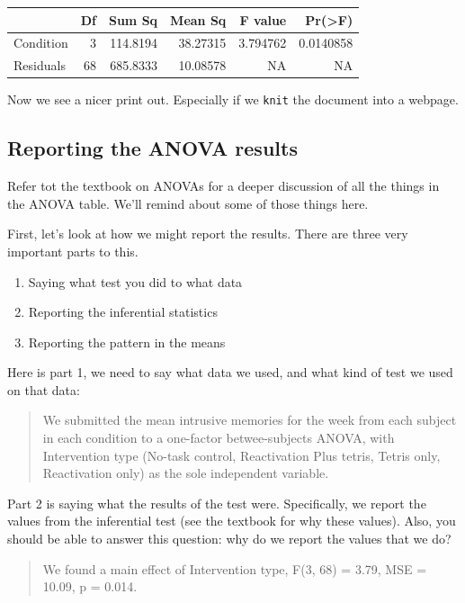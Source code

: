 \documentclass[]{book}
\providecommand{\tightlist}{%
  \setlength{\itemsep}{0pt}\setlength{\parskip}{0pt}}
\begin{document}
\begin{tabular}{l|r|r|r|r|r}
\hline
  & Df & Sum Sq & Mean Sq & F value & Pr(>F)\\
\hline
Condition & 3 & 114.8194 & 38.27315 & 3.794762 & 0.0140858\\
\hline
Residuals & 68 & 685.8333 & 10.08578 & NA & NA\\
\hline
\end{tabular}

Now we see a nicer print out. Especially if we \texttt{knit} the
document into a webpage.

\subsection{Reporting the ANOVA
results}\label{reporting-the-anova-results}

Refer tot the textbook on ANOVAs for a deeper discussion of all the
things in the ANOVA table. We'll remind about some of those things here.

First, let's look at how we might report the results. There are three
very important parts to this.

\begin{enumerate}
\def\labelenumi{\arabic{enumi}.}
\tightlist
\item
  Saying what test you did to what data
\item
  Reporting the inferential statistics
\item
  Reporting the pattern in the means
\end{enumerate}

Here is part 1, we need to say what data we used, and what kind of test
we used on that data:

\begin{quote}
We submitted the mean intrusive memories for the week from each subject
in each condition to a one-factor betwee-subjects ANOVA, with
Intervention type (No-task control, Reactivation Plus tetris, Tetris
only, Reactivation only) as the sole independent variable.
\end{quote}

Part 2 is saying what the results of the test were. Specifically, we
report the values from the inferential test (see the textbook for why
these values). Also, you should be able to answer this question: why do
we report the values that we do?

\begin{quote}
We found a main effect of Intervention type, F(3, 68) = 3.79, MSE =
10.09, p = 0.014.
\end{quote}
\end{document}
